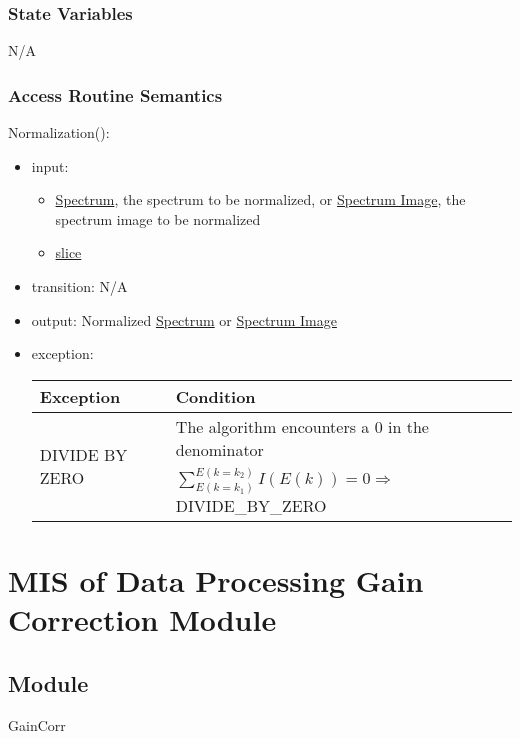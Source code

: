 \documentclass[12pt, titlepage]{article}
\begin{document}
\subsubsection{State Variables}
N/A

\subsubsection{Access Routine Semantics}

\noindent Normalization():
\begin{itemize}
    \item input: 
    \begin{itemize}
        \item \hyperref[Mod:Spectrum]{Spectrum}, the spectrum to be normalized, or \hyperref[Mod:SI]{Spectrum Image}, the spectrum image to be normalized
        \item \hyperref[Mod:Slice1D]{slice}
    \end{itemize}
    \item transition: N/A
    \item output: Normalized \hyperref[Mod:Spectrum]{Spectrum} or \hyperref[Mod:SI]{Spectrum Image}
    \item exception:
    \begin{center}
        \begin{tabular}{p{3.5cm} p{12cm}}
            \toprule[0.15em]
            \textbf{Exception} & \textbf{Condition}\\
            \midrule[0.1em]
            \multirow{2}{0.25\textwidth}{DIVIDE BY ZERO} & The algorithm encounters a 0 in the denominator\\ 
            & $\sum_{E(k=k_1)}^{E(k=k_2)}{I(E(k))} = 0 \Rightarrow$ DIVIDE\_BY\_ZERO\\ 
            \bottomrule[0.15em]
        \end{tabular}
    \end{center}
\end{itemize}

\section{MIS of Data Processing Gain Correction Module} \label{Mod:GainCorr}

\subsection{Module}
GainCorr
\end{document}
